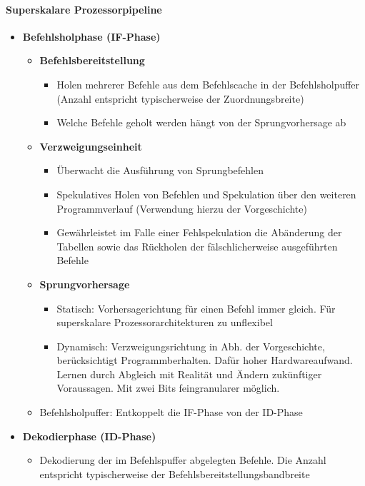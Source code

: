 		\paragraph{Superskalare Prozessorpipeline}
			\begin{itemize}
				\item \textbf{Befehlsholphase (IF-Phase)}
				\begin{itemize}
					\item \textbf{Befehlsbereitstellung}
					\begin{itemize}
						\item Holen mehrerer Befehle aus dem Befehlscache in der Befehlsholpuffer (Anzahl entspricht typischerweise der Zuordnungsbreite)
						\item Welche Befehle geholt werden hängt von der Sprungvorhersage ab
					\end{itemize}
					\item \textbf{Verzweigungseinheit}
					\begin{itemize}
						\item Überwacht die Ausführung von Sprungbefehlen
						\item Spekulatives Holen von Befehlen und Spekulation über den weiteren Programmverlauf (Verwendung hierzu der Vorgeschichte)
						\item Gewährleistet im Falle einer Fehlspekulation die Abänderung der Tabellen sowie das Rückholen der fälschlicherweise ausgeführten Befehle
					\end{itemize}
					\item \textbf{Sprungvorhersage} 
					\begin{itemize}
						\item Statisch: Vorhersagerichtung für einen Befehl immer gleich. Für superskalare Prozessorarchitekturen zu unflexibel
						\item Dynamisch: Verzweigungsrichtung in Abh. der Vorgeschichte, berücksichtigt Programmberhalten. Dafür hoher Hardwareaufwand. Lernen durch Abgleich mit Realität und Ändern zukünftiger Voraussagen. Mit zwei Bits feingranularer möglich.
					\end{itemize}
					\item Befehlsholpuffer: Entkoppelt die IF-Phase von der ID-Phase
				\end{itemize}
				\item \textbf{Dekodierphase (ID-Phase)}
				\begin{itemize}
					\item Dekodierung der im Befehlspuffer abgelegten Befehle. Die Anzahl entspricht typischerweise der Befehlsbereitstellungsbandbreite

\end{itemize}
\end{itemize}
